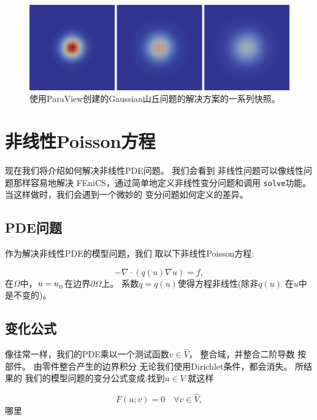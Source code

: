 \begin{figure}[!ht]  %
 \centerline{\includegraphics[width=0.95\linewidth]{fig/heat.png}}
 \caption{
 使用ParaView创建的Gaussian山丘问题的解决方案的一系列快照。\label{fig:snapshots}
 }
\end{figure}

\section{非线性Poisson方程}
\label{ftut1:gallery:nonlinearpoisson}


现在我们将介绍如何解决非线性PDE问题。 我们会看到
非线性问题可以像线性问题那样容易地解决
FEniCS，通过简单地定义非线性变分问题和调用
\texttt{solve}功能。 当这样做时，我们会遇到一个微妙的
变分问题如何定义的差异。

\subsection{PDE问题}

作为解决非线性PDE的模型问题，我们
取以下非线性Poisson方程:

\begin{equation}
-\nabla\cdot\left(q(u)\nabla u\right) = f,
\end{equation}
在$\Omega$中，$u=u_{_\mathrm{D}}$在边界$\partial\Omega$上。
系数$q = q(u)$使得方程非线性(除非$q(u)$
在$u$中是不变的)。

\subsection{变化公式}

像往常一样，我们的PDE乘以一个测试函数$v\in\hat V$，
整合域，并整合二阶导数
按部件。 由零件整合产生的边界积分
无论我们使用Dirichlet条件，都会消失。 所结果的
我们的模型问题的变分公式变成:找到$u \in V$
就这样

\begin{equation}
F(u; v) = 0 \quad \forall v \in \hat{V},
\label{ch:poisson0:nonlinear1}
\end{equation}
哪里

